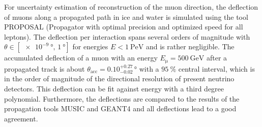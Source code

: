 For uncertainty estimation of reconstruction of the muon direction, the 
deflection of muons along a propagated path in ice and water is simulated using 
the tool PROPOSAL (Propagator with optimal precision and optimized speed for all leptons). 
The deflection per interaction spans several 
orders of magnitude with $\theta \in [\SI[print-unity-mantissa = false]{e-9}{\degree},\, \SI{1}{\degree}]$ 
for energies $E < \SI{1}{\peta\electronvolt}$ 
and is rather negligible. The accumulated 
deflection of a muon with an energy $E_{\mathrm{\mu}} = \SI{500}{\giga\electronvolt}$ 
after a propagated track is about $\theta_{\text{acc}} = 0.10_{-0.02}^{+0.27}\,\si{\degree}$ 
with a $\SI{95}{\percent}$ central interval, which is in the order of magnitude of 
the directional resolution of 
present neutrino detectors. This deflection can be fit against energy with a 
third degree polynomial. Furthermore, the deflections are compared to the results 
of the propagation tools MUSIC and GEANT4 and all deflections lead to 
a good agreement.




